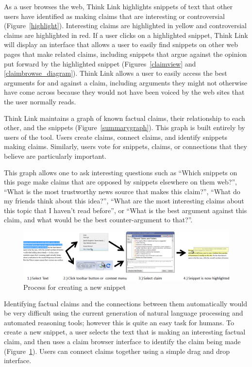 \documentclass{chi2009}
\begin{document}
As a user browses the web, Think Link highlights snippets of text that other users have identified as making claims that are interesting or controversial (Figure~\ref{highlight}). Interesting claims are highlighted in yellow and controversial claims are highlighted in red. If a user clicks on a highlighted snippet, Think Link will display an interface that allows a user to easily find snippets on other web pages that make related claims, including snippets that argue against the opinion put forward by the highlighted snippet (Figures~\ref{claimview} and \ref{claimbrowse_diagram}). Think Link allows a user to easily access the best arguments for and against a claim, including arguments they might not otherwise have come across because they would not have been voiced by the web sites that the user normally reads. 

Think Link maintains a graph of known factual claims, their relationship to each other, and the snippets (Figure~\ref{summarygraph}). This graph is built entirely by users of the tool. Users create claims, connect claims, and identify snippets making claims. Similarly, users vote for snippets, claims, or connections that they believe are particularly important.

This graph allows one to ask interesting questions such as ``Which snippets on this page make claims that are opposed by snippets elsewhere on them web?'', ``What is the most trustworthy news source that makes this claim?'', ``What do my friends think about this idea?'', ``What are the most interesting claims about this topic that I haven't read before'', or ``What is the best argument against this claim, and what would be the best counter-argument to that?''.

\begin{figure}[tb]
	\begin{center}
	\includegraphics[width=14cm]{../screenshots/newsnip_all.png}
	\caption{Process for creating a new snippet}
	\label{createprocess}
	\end{center}
\end{figure}

Identifying factual claims and the connections between them automatically would be very difficult using the current generation of natural language processing and automated reasoning tools; however this is quite an easy task for humans.  To create a new snippet, a user selects the text that is making an interesting factual claim, and then uses a claim browser interface to identify the claim being made (Figure~\ref{createprocess}). Users can connect claims together using a simple drag and drop interface.
\end{document}
